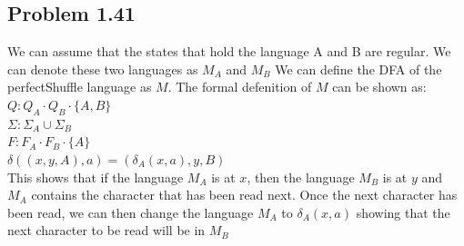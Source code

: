 \documentclass[letter]{article}
\theoremstyle{case}
\begin{document}
\subsection*{Problem 1.41}
We can assume that the states that hold the language A and B are regular. We can denote these two languages as $M_A$ and $M_B$
We can define the DFA of the perfectShuffle language as $M$. The formal defenition of $M$ can be shown as: \\
$Q: Q_A \cdot Q_B \cdot \{A,B\}$ \\
$\Sigma: \Sigma_A \cup \Sigma_B$ \\
$F: F_A \cdot F_B \cdot \{A\}$ \\
$\delta((x,y,A),a) = (\delta_A(x,a),y,B)$ \\
This shows that if the language $M_A$ is at $x$, then the language $M_B$ is at $y$ and $M_A$ contains the character that has been read next. Once the next character has been read, we can then change the language $M_A$ to $\delta_A(x,a)$ showing that the next character to be read will be in $M_B$
\end{document}

